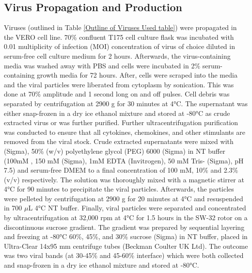 \subsection{Virus Propagation and Production} \label{Virus Propagation and Production}
Viruses (outlined in Table \ref{Outline of Viruses Used table}) were propagated in the VERO cell line. 70\% confluent T175 cell culture flask was incubated with 0.01 multiplicity of infection (MOI) concentration of virus of choice diluted in serum-free cell culture medium for 2 hours. Afterwards, the virus-containing media was washed away with PBS and cells were incubated in 2\% serum-containing growth media for 72 hours. After, cells were scraped into the media and the viral particles were liberated from cytoplasm by sonication. This was done at 70\% amplitude and 1 second long on and off pulses. Cell debris was separated by centrifugation at 2900 g for 30 minutes at 4°C. The supernatant was either snap-frozen in a dry ice ethanol mixture and stored at -80°C as crude extracted virus or was further purified. Further ultracentrifugation purification was conducted to ensure that all cytokines, chemokines, and other stimulants are removed from the viral stock. Crude extracted supernatants were mixed with  (Sigma), 50\% (w/v) polyethylene glycol (PEG) 6000 (Sigma) in NT buffer (100mM , 150 mM  (Sigma), 1mM EDTA (Invitrogen), 50 mM Tris- (Sigma), pH 7.5) and serum-free DMEM to a final concentration of 100 mM, 10\% and 2.3\% (v/v) respectively. The solution was thoroughly mixed with a magnetic stirrer at 4°C for 90  minutes to precipitate the viral particles. Afterwards, the particles were pelleted by centrifugation at 2900 g for 20 minutes at 4°C and resuspended in 700 \(\mu\)L 4°C NT buffer. Finally, viral particles were separated and concentrated by ultracentrifugation at 32,000 rpm at 4°C for 1.5 hours in the SW-32 rotor on a discontinuous sucrose gradient. The gradient was prepared by sequential layering and freezing at -80°C 60\%, 45\%, and 30\% sucrose (Sigma) in NT buffer, placed in Ultra-Clear 14x95 mm centrifuge tubes (Beckman Coulter UK Ltd). The outcome was two viral bands (at 30-45\% and 45-60\% interface) which were both collected and snap-frozen in a dry ice ethanol mixture and stored at -80°C.

